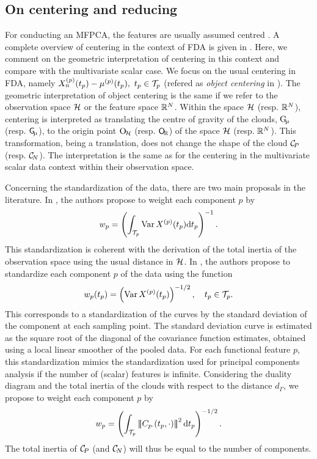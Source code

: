 \subsection{On centering and reducing} %
\label{sub:on_centering_and_reducing}

For conducting an MFPCA, the features are usually assumed centred \citep{happMultivariateFunctionalPrincipal2018a}. A complete overview of centering in the context of FDA is given in \cite{protheroNewPerspectivesCentering2023}. Here, we comment on the geometric interpretation of centering in this context and compare with the multivariate scalar case. We focus on the usual centering in FDA, namely $X_n^{(p)}(t_p) - \mu^{(p)}(t_p),~t_p \in \mathcal{T}_{p}$ (refered as \emph{object centering} in \cite{protheroNewPerspectivesCentering2023}).
The geometric interpretation of object centering is the same if we refer to the observation space $\mathcal{H}$ or the feature space $\mathbb{R}^N$. Within the space $\mathcal{H}$ (resp. $\mathbb{R}^N$), centering is interpreted as translating the centre of gravity of the clouds, $\mathrm{G}_{\!\mu}$ (resp. $\mathsf{G}_{\!\mu}$), to the origin point $\mathrm{O}_{\!\mathcal{H}}$ (resp. $\mathsf{O}_{\!\mathbb{R}}$) of the space $\mathcal{H}$ (resp. $\mathbb{R}^N$). This transformation, being a translation, does not change the shape of the cloud $\mathcal{C}_{\!P}$ (resp. $\mathcal{C}_{\!N}$). The interpretation is the same as for the centering in the multivariate scalar data context within their observation space.

Concerning the standardization of the data, there are two main proposals in the literature. In \cite{happMultivariateFunctionalPrincipal2018a}, the authors propose to weight each component $p$ by
\begin{equation}
w_p = \left(\int_{\TT{p}} \Var X^{(p)}(t_p) \dd t_p\right)^{-1}.
\end{equation}
This standardization is coherent with the derivation of the total inertia of the observation space using the usual distance in $\mathcal{H}$. In \cite{chiouMultivariateFunctionalPrincipal2014}, the authors propose to standardize each component $p$ of the data using the function
\begin{equation}
w_p(t_p) = \left(\Var X^{(p)}(t_p)\right)^{-1/2}, \quad t_p \in \TT{p}.
\end{equation}
This corresponds to a standardization of the curves by the standard deviation of the component at each sampling point. The standard deviation curve is estimated as the square root of the diagonal of the covariance function estimates, obtained using a local linear smoother of the pooled data. For each functional feature $p$, this standardization mimics the standardization used for principal components analysis if the number of (scalar) features is infinite.
Considering the duality diagram and the total inertia of the clouds with respect to the distance $d_\Gamma$, we propose to weight each component $p$ by
\begin{equation}
    w_p = \left(\int_{\TT{p}} \normH{C_{p \cdot}(t_p, \cdot)}^2 \dd t_p\right)^{-1/2}.
\end{equation}
The total inertia of $\mathcal{C}_{\!P}$ (and $\mathcal{C}_{\!N}$) will thus be equal to the number of components.


